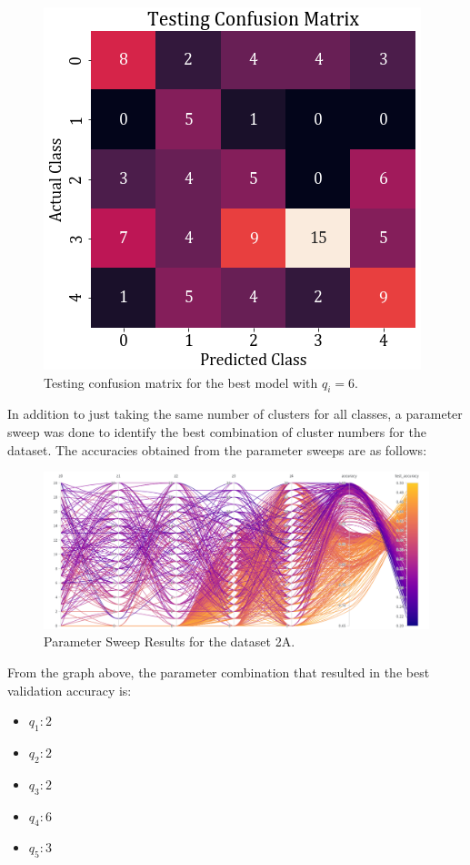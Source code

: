 \documentclass[11pt,a4paper]{article}
\newcommand{\noi}{\noindent}
\begin{document}
\begin{figure}[H]
    \centering
    \includegraphics[scale=0.5]{images/2a_full_test_conf.png}
    \caption{Testing confusion matrix for the best model with $q_i=6$.}
\end{figure}

\noi
In addition to just taking the same number of clusters for all classes, a parameter sweep was done to identify the best combination of cluster numbers for the dataset. The accuracies obtained from the parameter sweeps are as follows:
\begin{figure}[H]
    \centering
    \includegraphics[scale=0.35]{images/2a_parameter_sweep.png}
    \caption{Parameter Sweep Results for the dataset 2A.}
\end{figure}

\noi
From the graph above, the parameter combination that resulted in the best validation accuracy is:
\begin{itemize}
    \itemsep0em
    \item $q_1: 2$
    \item $q_2: 2$
    \item $q_3: 2$
    \item $q_4: 6$
    \item $q_5: 3$
\end{itemize}
\end{document}
